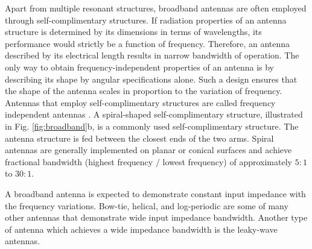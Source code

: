 Apart from multiple resonant structures, broadband antennas are often employed through self-complimentary structures. If radiation properties of an antenna structure is determined by its dimensions in terms of wavelengths, its performance would strictly be a function of frequency. Therefore, an antenna described by its electrical length results in narrow bandwidth of operation. The only way to obtain frequency-independent properties of an antenna is by describing its shape by angular specifications alone. Such a design ensures that the shape of the antenna scales in proportion to the variation of frequency. Antennas that employ self-complimentary structures are called frequency independent antennas \cite{Rumsey1957}. A spiral-shaped self-complimentary structure, illustrated in Fig. \ref{fig:broadband}b, is a commonly used self-complimentary structure. The antenna structure is fed between the closest ends of the two arms. Spiral antennas are generally implemented on planar or conical surfaces and achieve fractional bandwidth (highest frequency $/$ lowest frequency) of approximately $5:1$ to $30:1$. 

 
A broadband antenna is expected to demonstrate constant input impedance with the frequency variations. Bow-tie, helical, and log-periodic are some of many other antennas that demonstrate wide input impedance bandwidth. Another type of antenna which achieves a wide impedance bandwidth is the leaky-wave antennas. %




